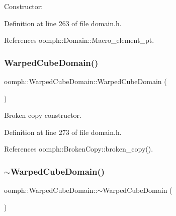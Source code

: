 Constructor\+: 



Definition at line 263 of file domain.\+h.



References oomph\+::\+Domain\+::\+Macro\+\_\+element\+\_\+pt.

\mbox{\label{classoomph_1_1WarpedCubeDomain_a4da58a937c4e0579a2c167fbaf3d39c3}} 
\subsubsection{\texorpdfstring{Warped\+Cube\+Domain()}{WarpedCubeDomain()}\hspace{0.1cm}{\footnotesize\ttfamily [2/2]}}
{\footnotesize\ttfamily oomph\+::\+Warped\+Cube\+Domain\+::\+Warped\+Cube\+Domain (\begin{DoxyParamCaption}\item[{const \hyperlink{classoomph_1_1WarpedCubeDomain}{Warped\+Cube\+Domain} \&}]{ }\end{DoxyParamCaption})\hspace{0.3cm}{\ttfamily [inline]}}



Broken copy constructor. 



Definition at line 273 of file domain.\+h.



References oomph\+::\+Broken\+Copy\+::broken\+\_\+copy().

\mbox{\label{classoomph_1_1WarpedCubeDomain_af8c0702a965e345bbbbf0afbd5ff6ed0}} 
\subsubsection{\texorpdfstring{$\sim$\+Warped\+Cube\+Domain()}{~WarpedCubeDomain()}}
{\footnotesize\ttfamily oomph\+::\+Warped\+Cube\+Domain\+::$\sim$\+Warped\+Cube\+Domain (\begin{DoxyParamCaption}{ }\end{DoxyParamCaption})\hspace{0.3cm}{\ttfamily [inline]}}



